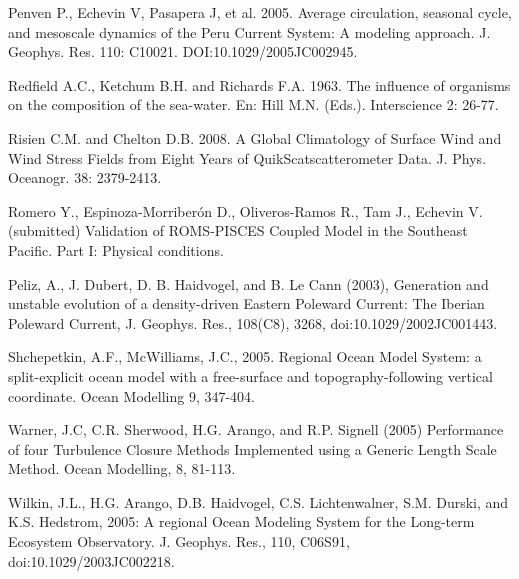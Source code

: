 Penven P., Echevin V, Pasapera J, et al. 2005. Average circulation, seasonal cycle, and mesoscale dynamics of the Peru Current System: A modeling approach. J. Geophys. Res. 110: C10021. DOI:10.1029/2005JC002945.

Redfield A.C., Ketchum B.H. and Richards F.A. 1963. The influence of organisms on the composition of the sea-water. En: Hill M.N. (Eds.). Interscience 2: 26-77.

Risien C.M. and Chelton D.B. 2008. A Global Climatology of Surface Wind and Wind Stress Fields from Eight Years of QuikScatscatterometer Data. J. Phys. Oceanogr. 38: 2379-2413.

Romero Y., Espinoza-Morriberón D., Oliveros-Ramos R., Tam J., Echevin V. (submitted) Validation of ROMS-PISCES Coupled Model in the Southeast Pacific. Part I: Physical conditions.

Peliz, A., J. Dubert, D. B. Haidvogel, and B. Le Cann (2003), Generation and unstable evolution of a density-driven Eastern Poleward Current: The Iberian Poleward Current, J. Geophys. Res., 108(C8), 3268, doi:10.1029/2002JC001443.

Shchepetkin, A.F., McWilliams, J.C., 2005. Regional Ocean Model System: a split-explicit ocean model with a free-surface and topography-following vertical coordinate. Ocean Modelling 9, 347-404.

Warner, J.C, C.R. Sherwood, H.G. Arango, and R.P. Signell (2005) Performance of four Turbulence Closure Methods Implemented using a Generic Length Scale Method. Ocean Modelling, 8, 81-113.

Wilkin, J.L., H.G. Arango, D.B. Haidvogel, C.S. Lichtenwalner, S.M. Durski, and K.S. Hedstrom, 2005: A regional Ocean Modeling System for the Long-term Ecosystem Observatory. J. Geophys. Res., 110, C06S91, doi:10.1029/2003JC002218.

